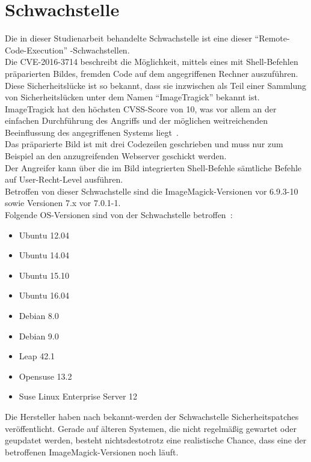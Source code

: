 \section{Schwachstelle}\label{sec:schwachstelle}

Die in dieser Studienarbeit behandelte Schwachstelle ist eine dieser "`Remote-Code-Execution"' -Schwachstellen.\\

Die CVE-2016-3714 beschreibt die Möglichkeit, mittels eines mit Shell-Befehlen präparierten Bildes, fremden Code auf dem angegriffenen Rechner auszuführen.\\

Diese Sicherheitslücke ist so bekannt, dass sie inzwischen als Teil einer Sammlung von Sicherheitslücken unter dem Namen "`ImageTragick"' bekannt ist.\\

ImageTragick hat den höchsten CVSS-Score von 10, was vor allem an der einfachen Durchführung des Angriffs und der möglichen weitreichenden Beeinflussung des angegriffenen Systems liegt~\cite{ImagemagickProductsVulnerabilities}.\\
Das präparierte Bild ist mit drei Codezeilen geschrieben und muss nur zum Beispiel an den anzugreifenden Webserver geschickt werden.\\
Der Angreifer kann über die im Bild integrierten Shell-Befehle sämtliche Befehle auf User-Recht-Level ausführen.\\

Betroffen von dieser Schwachstelle sind die ImageMagick-Versionen vor 6.9.3-10 sowie Versionen 7.x vor 7.0.1-1.\\
Folgende OS-Versionen sind von der Schwachstelle betroffen~\cite{CVE20163714EPHEMERALHTTPS}:
\begin{itemize}[\itemsep=1em]
    \item Ubuntu 12.04
    \item Ubuntu 14.04
    \item Ubuntu 15.10
    \item Ubuntu 16.04
    \item Debian 8.0
    \item Debian 9.0
    \item Leap 42.1
    \item Opensuse 13.2
    \item Suse Linux Enterprise Server 12
\end{itemize}

Die Hersteller haben nach bekannt-werden der Schwachstelle Sicherheitspatches veröffentlicht.
Gerade auf älteren Systemen, die nicht regelmäßig gewartet oder geupdatet werden,
besteht nichtsdestotrotz eine realistische Chance, dass eine der betroffenen ImageMagick-Versionen noch läuft.\\